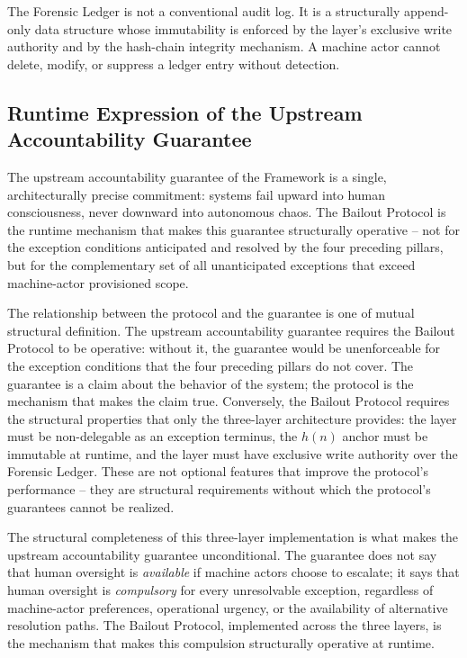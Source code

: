 The Forensic Ledger is not a conventional audit log. It is a structurally
append-only data structure whose immutability is enforced by the \fact{} layer's
exclusive write authority and by the hash-chain integrity mechanism. A machine
actor cannot delete, modify, or suppress a ledger entry without detection.

\subsection{Runtime Expression of the Upstream Accountability Guarantee}\label{sec:runtime-expression}

The upstream accountability guarantee of the \bxthree{} Framework is a single,
architecturally precise commitment: \bxthree{} systems fail upward into human
consciousness, never downward into autonomous chaos. The Bailout Protocol is the
runtime mechanism that makes this guarantee structurally operative -- not for the
exception conditions anticipated and resolved by the four preceding pillars, but for
the complementary set of all unanticipated exceptions that exceed machine-actor
provisioned scope.

The relationship between the protocol and the guarantee is one of mutual structural
definition. The upstream accountability guarantee requires the Bailout Protocol to be
operative: without it, the guarantee would be unenforceable for the exception
conditions that the four preceding pillars do not cover. The guarantee is a claim
about the behavior of the system; the protocol is the mechanism that makes the claim
true. Conversely, the Bailout Protocol requires the structural properties that only
the \bxthree{} three-layer architecture provides: the \purpose{} layer must be
non-delegable as an exception terminus, the $h(n)$ anchor must be immutable at runtime,
and the \fact{} layer must have exclusive write authority over the Forensic Ledger.
These are not optional features that improve the protocol's performance -- they are
structural requirements without which the protocol's guarantees cannot be realized.

The structural completeness of this three-layer implementation is what makes the
upstream accountability guarantee unconditional. The guarantee does not say that human
oversight is \emph{available} if machine actors choose to escalate; it says that
human oversight is \emph{compulsory} for every unresolvable exception, regardless of
machine-actor preferences, operational urgency, or the availability of alternative
resolution paths. The Bailout Protocol, implemented across the three \bxthree{} layers,
is the mechanism that makes this compulsion structurally operative at runtime.

